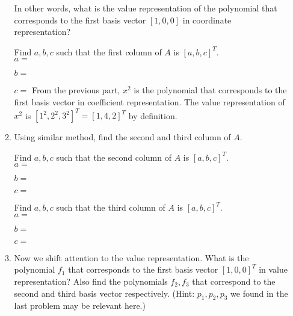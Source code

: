 \documentclass[11pt, preview]{standalone} %
\begin{document}
\begin{enumerate}
\begin{enumerate}
In other words, what is the value representation of the polynomial that corresponds to the first basis vector $[1, 0, 0]$ in coordinate representation?
\begin{Freeform}{1}
 Find $a, b, c$ such that the first column of $A$ is $[a, b, c]^T$. \\
  $a = $
 \end{Freeform}
 \begin{Freeform}{4}
  $b = $
 \end{Freeform}
 \begin{Freeform}{2}
  $c = $
  \Solution From the previous part, $x^2$ is the polynomial that corresponds to the first basis vector in coefficient representation.
  The value representation of $x^2$ is $[1^2, 2^2, 3^2]^T = [1, 4, 2]^T$ by definition.
 \end{Freeform}
\item  Using similar method, find the second and third column of $A$.
\begin{Freeform}{1}
 Find $a, b, c$ such that the second column of $A$ is $[a, b, c]^T$. \\
  $a = $
 \end{Freeform}
 \begin{Freeform}{2}
  $b = $
 \end{Freeform}
 \begin{Freeform}{3}
  $c = $
 \end{Freeform}
 \begin{Freeform}{1}
 Find $a, b, c$ such that the third column of $A$ is $[a, b, c]^T$. \\
  $a = $
 \end{Freeform}
 \begin{Freeform}{1}
  $b = $
 \end{Freeform}
 \begin{Freeform}{1}
  $c = $
 \end{Freeform}
 \item Now we shift attention to the value representation. What is the polynomial $f_1$ that corresponds to the first basis vector $[1, 0, 0]^T$ in value representation?
  Also find the polynomials $f_2, f_3$ that correspond to the second and third basis vector respectively. (Hint: $p_1, p_2, p_3$ we found in the last problem may be relevant here.)


\end{enumerate}
\end{enumerate}
\end{document}
